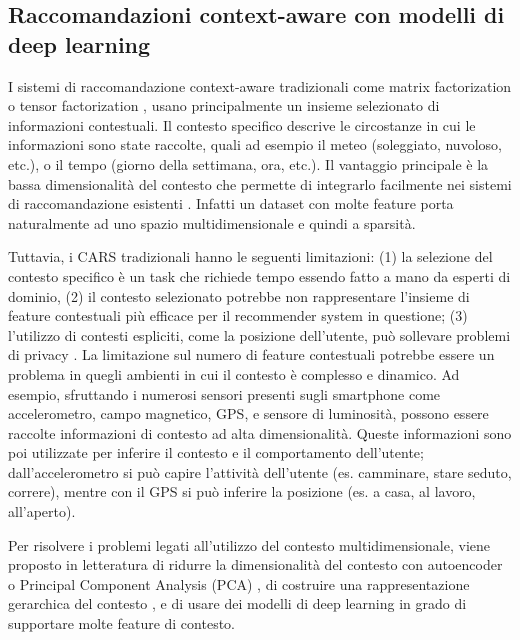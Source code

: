 \subsection{Raccomandazioni context-aware con modelli di deep learning}
I sistemi di raccomandazione context-aware tradizionali come matrix factorization \cite{mf-context-aware} o tensor factorization \cite{tensor-context-aware}, usano principalmente un insieme selezionato di informazioni contestuali. Il contesto specifico descrive le circostanze in cui le informazioni sono state raccolte, quali ad esempio il meteo (soleggiato, nuvoloso, etc.), o il tempo (giorno della settimana, ora, etc.). Il vantaggio principale è la bassa dimensionalità del contesto che permette di integrarlo facilmente nei sistemi di raccomandazione esistenti \cite{context-aware-deep-learning}. Infatti un dataset con molte feature porta naturalmente ad uno spazio multidimensionale e quindi a sparsità.

Tuttavia, i CARS tradizionali  hanno le seguenti limitazioni: (1) la selezione del contesto specifico è un task che richiede tempo essendo fatto a mano da esperti di dominio, (2) il contesto selezionato potrebbe non rappresentare l'insieme di feature contestuali più efficace per il recommender system in questione; (3) l'utilizzo di contesti espliciti, come la posizione dell'utente, può sollevare problemi di privacy  \cite{context-aware-deep-learning}. La limitazione sul numero di feature contestuali potrebbe essere un problema in quegli ambienti in cui il contesto è complesso e dinamico. Ad esempio, sfruttando i numerosi sensori presenti sugli smartphone come accelerometro, campo magnetico, GPS, e sensore di luminosità, possono essere raccolte informazioni di contesto ad alta dimensionalità. Queste informazioni sono poi utilizzate per inferire il contesto e il comportamento dell'utente; dall'accelerometro si può capire l'attività dell'utente (es. camminare, stare seduto, correre), mentre con il GPS si può inferire la posizione (es. a casa, al lavoro, all'aperto).

Per risolvere i problemi legati all'utilizzo del contesto multidimensionale, viene proposto in letteratura di ridurre la dimensionalità del contesto con autoencoder o Principal Component Analysis (PCA) \cite{latent-context} \cite{context-autoencoder}, di costruire una rappresentazione gerarchica del contesto \cite{hierarchical-context}, e di usare dei modelli di deep learning in grado di supportare molte feature di contesto\cite{context-aware-deep-learning}.

